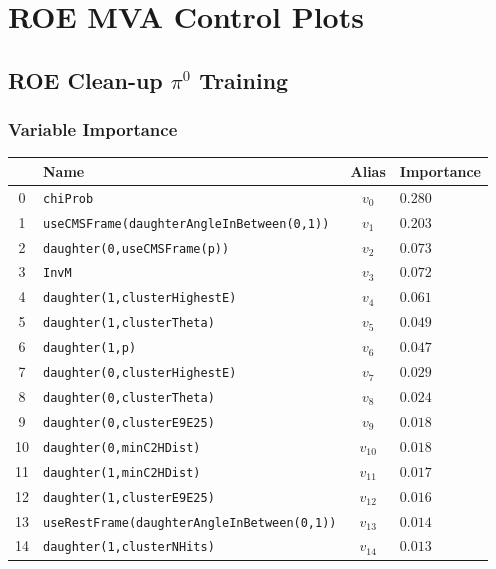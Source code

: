 \chapter{ROE MVA Control Plots}\label{sec:roe-control-plots}
\section{ROE Clean-up \texorpdfstring{$\pi^0$}{pi0} Training}\label{sec:ROE_pi0}

\subsection{Variable Importance}

\begin{longtable}{c|l|c|l}
& Name & Alias & Importance \\
\toprule 
0 &\texttt{\footnotesize chiProb} & $v_{0}$ & $0.280$ \\ 
1 &\texttt{\footnotesize useCMSFrame(daughterAngleInBetween(0,1))} & $v_{1}$ & $0.203$ \\ 
2 &\texttt{\footnotesize daughter(0,useCMSFrame(p))} & $v_{2}$ & $0.073$ \\ 
3 &\texttt{\footnotesize InvM} & $v_{3}$ & $0.072$ \\ 
4 &\texttt{\footnotesize daughter(1,clusterHighestE)} & $v_{4}$ & $0.061$ \\ 
5 &\texttt{\footnotesize daughter(1,clusterTheta)} & $v_{5}$ & $0.049$ \\ 
6 &\texttt{\footnotesize daughter(1,p)} & $v_{6}$ & $0.047$ \\ 
7 &\texttt{\footnotesize daughter(0,clusterHighestE)} & $v_{7}$ & $0.029$ \\ 
8 &\texttt{\footnotesize daughter(0,clusterTheta)} & $v_{8}$ & $0.024$ \\ 
9 &\texttt{\footnotesize daughter(0,clusterE9E25)} & $v_{9}$ & $0.018$ \\ 
10 &\texttt{\footnotesize daughter(0,minC2HDist)} & $v_{10}$ & $0.018$ \\ 
11 &\texttt{\footnotesize daughter(1,minC2HDist)} & $v_{11}$ & $0.017$ \\ 
12 &\texttt{\footnotesize daughter(1,clusterE9E25)} & $v_{12}$ & $0.016$ \\ 
13 &\texttt{\footnotesize useRestFrame(daughterAngleInBetween(0,1))} & $v_{13}$ & $0.014$ \\ 
14 &\texttt{\footnotesize daughter(1,clusterNHits)} & $v_{14}$ & $0.013$ \\ 

\end{longtable}
